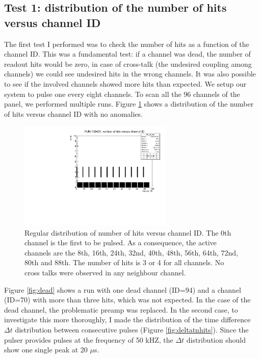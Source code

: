 \subsection{Test 1: distribution of the number of hits versus channel ID}\label{nhitvschid}
The first test I performed was to check the number of hits as a function 
of the channel ID. This was a fundamental test: if a channel was dead, 
the number of readout hits would be zero, in case of cross-talk  
(the undesired coupling among channels) we could see undesired hits in the wrong channels. 
It was also possible to see if the involved channels showed more hits than expected. 
We setup our system to pulse one every eight channels.
To scan all the 96 channels of the panel, we performed multiple runs. 
Figure \ref{fig:normalhits} shows a distribution of the number of 
hits versus channel ID with no anomalies.
\begin{figure}[!h]
      \centering
      \includegraphics[width=0.65\textwidth]{figures/pdf/run105421_nh_vs_ch.pdf}
      \caption{Regular distribution of number of hits versus channel ID. 
      The 0th channel is the first to be pulsed.
      As a consequence, the active channels are the 8th, 16th, 24th, 
      32nd, 40th, 48th, 56th, 64th, 72nd, 80th and 88th. 
      The number of hits is 3 or 4 for all channels. 
      No cross talks were observed in any neighbour channel.}
     \label{fig:normalhits}
\end{figure}
Figure \ref{fig:dead} shows a run with one dead channel (ID=94) 
and a channel (ID=70) with more than three hits, which was not expected. 
In the case of the dead channel, the problematic preamp 
was replaced. In the second case, to investigate this more thoroughly, 
I made the distribution of the time difference 
$\Delta t$ distribution between consecutive pulses (Figure \ref{fig:deltatnhits}).
Since the pulser provides pulses at the frequency of 50 kHZ, the $\Delta t$ 
distribution should show one single peak at 20 $\mu$s. 
